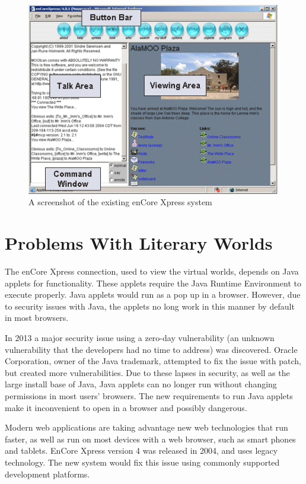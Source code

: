 \documentclass[12pt, letterpaper]{report}
\begin{document}
\par
\begin{figure}[htp]
\centering
\includegraphics{enCoreScreen.png}
\caption{A screenshot of the existing enCore Xpress system \cite{xpress}}
\label{fig1}
\label{overflow}
\end{figure}

\section{Problems With Literary Worlds}
\par
The enCore Xpress connection, used to view the virtual worlds, depends on Java applets for functionality.  These applets require the Java Runtime Environment to execute properly. Java applets would run as a pop up in a browser.  However, due to security issues with Java, the applets no long work in this manner by default in most browsers.

\par
In 2013 a major security issue using a zero-day vulnerability (an unknown vulnerability that the developers had no time to address) was discovered.  Oracle Corporation, owner of the Java trademark, attempted to fix the issue with patch, but created more vulnerabilities. Due to these lapses in security, as well as the large install base of Java, Java applets can no longer run without changing permissions in most users' browsers.
The new requirements to run Java applets make it inconvenient to open in a browser and possibly dangerous.

\par
Modern web applications are taking advantage new web technologies that run faster, as well as run on most devices with a web browser, such as smart phones and tablets.  EnCore Xpress version 4 was released in 2004, and uses legacy technology. The new system would fix this issue using commonly supported development platforms.
\end{document}

